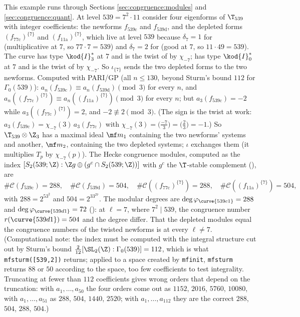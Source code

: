 \begin{example}[level $539$ at $\ell=3$]\label{ex:congruence:level-539}
This example runs through Sections \ref{sec:congruence:modules} and \ref{sec:congruence:quant}. At level $539=7^2\cdot11$ consider four eigenforms of $\T_{539}$ with integer
coefficients: the newforms $f_{\text{539c}}$ and $f_{\text{539d}}$, and the depleted forms $(f_{\text{77c}})^{\{7\}}$ and $(f_{\text{11a}})^{\{7\}}$, which live at level $539$ because $\delta_7=1$ for
 (multiplicative at $7$, so $77\cdot7=539$) and $\delta_7=2$ for  (good at $7$, so $11\cdot49=539$). The curve  has type $\kod{I}_3^*$ at $7$ and is the twist of
 by $\chi_{-7}$;  has type $\kod{I}_0^*$ at $7$ and is the twist of  by $\chi_{-7}$. So $\iota_{\{7\}}$ sends the two depleted forms to the two newforms.
Computed with PARI/GP (all $n\le130$, beyond Sturm's bound $112$ for $\Gamma_0(539)$): $a_n(f_{\text{539c}})\equiv a_n(f_{\text{539d}})\pmod3$ for every $n$, and
$a_n((f_{\text{77c}})^{\{7\}})\equiv a_n((f_{\text{11a}})^{\{7\}})\pmod3$ for every $n$; but $a_3(f_{\text{539c}})=-2$ while $a_3((f_{\text{77c}})^{\{7\}})=2$, and $-2\not\equiv2\pmod3$. (The sign is the twist at work: $a_3(f_{\text{539c}})=\chi_{-7}(3)\,a_3(f_{\text{77c}})$ with
$\chi_{-7}(3)=\bigl(\frac{-7}3\bigr)=\bigl(\frac23\bigr)=-1$.) So $\T_{539}\otimes\Z_3$ has a maximal ideal $\mf m_1$
containing the two newforms' systems and another, $\mf m_2$, containing the two depleted systems; $\iota$ exchanges them (it multiplies $T_p$ by $\chi_{-7}(p)$). The Hecke
congruence modules, computed as the index $[S_2(539;\Z):\Z g\oplus(g^c\cap S_2(539;\Z))]$ with $g^c$ the $\T$-stable complement (), are
\[
\#\mathcal C(f_{\text{539c}})=288,\quad\#\mathcal C(f_{\text{539d}})=504,\quad\#\mathcal C((f_{\text{77c}})^{\{7\}})=288,\quad\#\mathcal C((f_{\text{11a}})^{\{7\}})=504,
\]
with $288=2^53^2$ and $504=2^33^27$. The modular degrees are $\deg\varphi_{\curve{539c1}}=288$ and $\deg\varphi_{\curve{539d1}}=72$ (): at $\ell=7$, where $7^2\mid539$, the
congruence number $r(\curve{539d1})=504$ and the degree differ. That the depleted modules equal the congruence numbers of the twisted newforms is
 at every $\ell\ne7$. (Computational note: the index must be computed with the integral structure cut out by Sturm's bound $\frac{2}{12}[\SL_2(\Z):\Gamma_0(539)]=112$,
which is what \texttt{mfsturm([539,2])} returns; applied to a space created by \texttt{mfinit}, \texttt{mfsturm} returns $88$ or $50$ according to the space, too few coefficients to test
integrality. Truncating at fewer than $112$ coefficients gives wrong orders that depend on the truncation: with $a_1,\dots,a_{50}$ the four orders come out as $1152$, $2016$, $5760$, $10080$, with
$a_1,\dots,a_{51}$ as $288$, $504$, $1440$, $2520$; with $a_1,\dots,a_{112}$ they are the correct $288$, $504$, $288$, $504$.)
\end{example}

